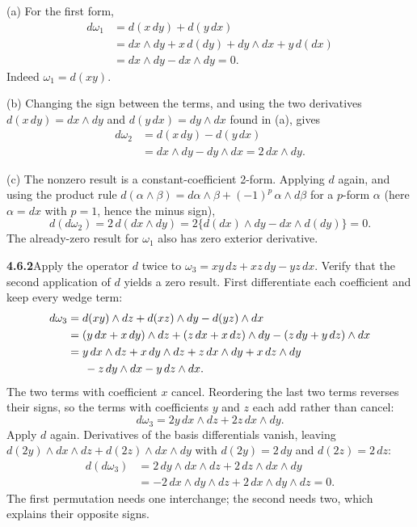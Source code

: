 (a) For the first form,
\begin{align*}
d\omega_1
&=d(x\,dy)+d(y\,dx)\\
&=dx\wedge dy+x\,d(dy)+dy\wedge dx+y\,d(dx)\\
&=dx\wedge dy-dx\wedge dy=\boxed{0}.
\end{align*}
Indeed $\omega_1=d(xy)$.

(b) Changing the sign between the terms, and using the two derivatives
$d(x\,dy)=dx\wedge dy$ and $d(y\,dx)=dy\wedge dx$ found in (a), gives
\begin{align*}
d\omega_2
&=d(x\,dy)-d(y\,dx)\\
&=dx\wedge dy-dy\wedge dx
=\boxed{2\,dx\wedge dy}.
\end{align*}

(c) The nonzero result is a constant-coefficient 2-form. Applying $d$
again, and using the product rule
$d(\alpha\wedge\beta)=d\alpha\wedge\beta+(-1)^p\,\alpha\wedge d\beta$
for a $p$-form $\alpha$ (here $\alpha=dx$ with $p=1$, hence the minus
sign),
\[
d(d\omega_2)
=2\,d(dx\wedge dy)
=2\{d(dx)\wedge dy-dx\wedge d(dy)\}=0.
\]
The already-zero result for $\omega_1$ also has zero exterior derivative.

\par\bigskip
\noindent\textbf{4.6.2}\quad Apply the operator $d$ twice to
$\omega_{3}=xy\,dz+xz\,dy-yz\,dx$. Verify that the second application of $d$
yields a zero result.
\solution
First differentiate each coefficient and keep every wedge term:
\begin{align*}
d\omega_3
&=d(xy)\wedge dz+d(xz)\wedge dy-d(yz)\wedge dx\\
&=(y\,dx+x\,dy)\wedge dz
 +(z\,dx+x\,dz)\wedge dy
 -(z\,dy+y\,dz)\wedge dx\\
&=y\,dx\wedge dz+x\,dy\wedge dz
 +z\,dx\wedge dy+x\,dz\wedge dy\\
&\hspace{1.5em}-z\,dy\wedge dx-y\,dz\wedge dx.
\end{align*}
The two terms with coefficient $x$ cancel. Reordering the last two
terms reverses their signs, so the terms with coefficients $y$ and $z$
each add rather than cancel:
\[
\boxed{d\omega_3=2y\,dx\wedge dz+2z\,dx\wedge dy}.
\]
Apply $d$ again. Derivatives of the basis differentials vanish, leaving
$d(2y)\wedge dx\wedge dz+d(2z)\wedge dx\wedge dy$ with $d(2y)=2\,dy$
and $d(2z)=2\,dz$:
\begin{align*}
d(d\omega_3)
&=2\,dy\wedge dx\wedge dz+2\,dz\wedge dx\wedge dy\\
&=-2\,dx\wedge dy\wedge dz+2\,dx\wedge dy\wedge dz=\boxed{0}.
\end{align*}
The first permutation needs one interchange; the second needs two,
which explains their opposite signs.


